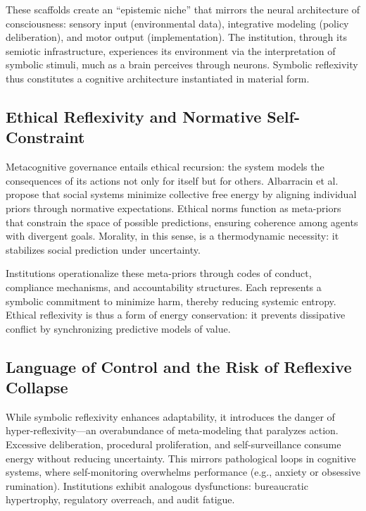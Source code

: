 \documentclass[11pt,a4paper]{article}
\begin{document}
These scaffolds create an “epistemic niche” that mirrors the neural architecture of consciousness: sensory input (environmental data), integrative modeling (policy deliberation), and motor output (implementation).  The institution, through its semiotic infrastructure, experiences its environment via the interpretation of symbolic stimuli, much as a brain perceives through neurons.  Symbolic reflexivity thus constitutes a cognitive architecture instantiated in material form.

\subsection{Ethical Reflexivity and Normative Self-Constraint}

Metacognitive governance entails ethical recursion: the system models the consequences of its actions not only for itself but for others.  Albarracin et al. \citep{Albarracin2022FromGenerativeModels} propose that social systems minimize collective free energy by aligning individual priors through normative expectations.  Ethical norms function as meta-priors that constrain the space of possible predictions, ensuring coherence among agents with divergent goals.  Morality, in this sense, is a thermodynamic necessity: it stabilizes social prediction under uncertainty.

Institutions operationalize these meta-priors through codes of conduct, compliance mechanisms, and accountability structures.  Each represents a symbolic commitment to minimize harm, thereby reducing systemic entropy.  Ethical reflexivity is thus a form of energy conservation: it prevents dissipative conflict by synchronizing predictive models of value.

\subsection{Language of Control and the Risk of Reflexive Collapse}

While symbolic reflexivity enhances adaptability, it introduces the danger of hyper-reflexivity—an overabundance of meta-modeling that paralyzes action.  Excessive deliberation, procedural proliferation, and self-surveillance consume energy without reducing uncertainty.  This mirrors pathological loops in cognitive systems, where self-monitoring overwhelms performance (e.g., anxiety or obsessive rumination).  Institutions exhibit analogous dysfunctions: bureaucratic hypertrophy, regulatory overreach, and audit fatigue.
\end{document}

